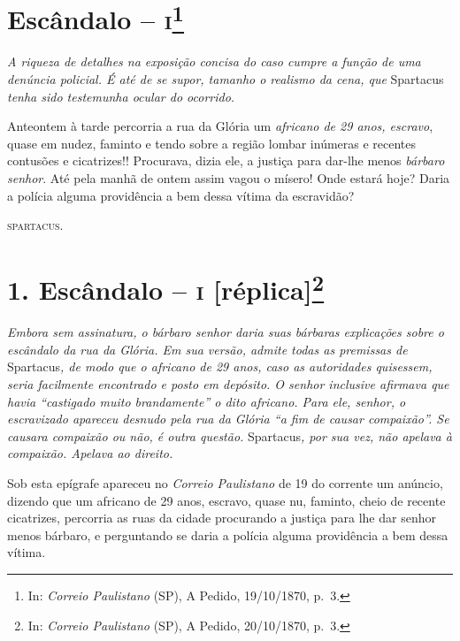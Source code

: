 {\chapter{Escândalo -- \textsc{i}\footnote{ In: \emph{Correio Paulistano} (SP), A Pedido, 19/10/1870,
  p.~3.}} %

\begin{didascalia}
\emph{A riqueza de detalhes na exposição concisa do caso cumpre a função
de uma denúncia policial. É até de se supor, tamanho o realismo da cena,
que} Spartacus \emph{tenha sido testemunha ocular do ocorrido.}
\end{didascalia}

\asterisc{}

Anteontem à tarde percorria a rua da Glória um \emph{africano de 29
anos, escravo}, quase em nudez, faminto e tendo sobre a região lombar
inúmeras e recentes contusões e cicatrizes!! Procurava, dizia ele, a
justiça para dar-lhe menos \emph{bárbaro senhor}. Até pela manhã de
ontem assim vagou o mísero! Onde estará hoje? Daria a polícia alguma
providência a bem dessa vítima da escravidão?
\begin{flushright}
\textsc{spartacus}.
\end{flushright}
\chapter{1. Escândalo -- \textsc{i} {[}réplica{]}\footnote{ In: \emph{Correio Paulistano} (SP), A Pedido, 20/10/1870,
  p.~3.}} %

\begin{didascalia}
\emph{Embora sem assinatura, o bárbaro senhor daria suas bárbaras
explicações sobre o escândalo da rua da Glória. Em sua versão, admite
todas as premissas de} Spartacus\emph{, de modo que o africano de 29
anos, caso as autoridades quisessem, seria facilmente encontrado e posto
em depósito. O senhor inclusive afirmava que havia ``castigado muito
brandamente'' o dito africano. Para ele, senhor, o escravizado apareceu
desnudo pela rua da Glória ``a fim de causar compaixão''. Se causara
compaixão ou não, é outra questão.} Spartacus\emph{, por sua vez, não
apelava à compaixão. Apelava ao direito.}
\end{didascalia}

\asterisc{}

Sob esta epígrafe apareceu no \emph{Correio Paulistano} de 19 do
corrente um anúncio, dizendo que um africano de 29 anos, escravo, quase
nu, faminto, cheio de recente cicatrizes, percorria as ruas da cidade
procurando a justiça para lhe dar senhor menos bárbaro, e perguntando se
daria a polícia alguma providência a bem dessa vítima.

}
